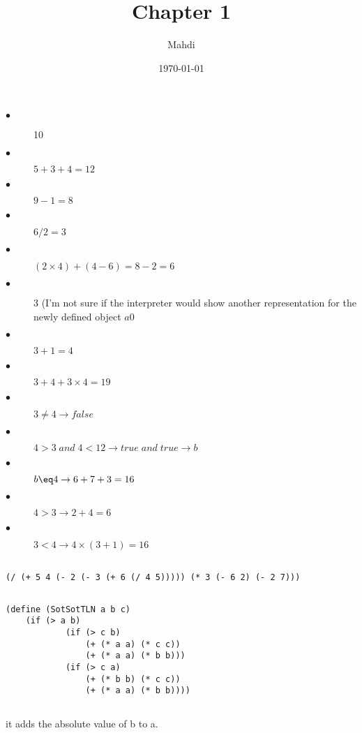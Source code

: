 \documentclass{article}
\title{Chapter 1}
\author{Mahdi}
\date\today
\begin{document}
\subsection{}
\begin{description}
  \item[$\bullet$] 10
  \item[$\bullet$] $5+3+4 = 12$
  \item[$\bullet$] $9-1 = 8$
  \item[$\bullet$] $6/2 = 3$
  \item[$\bullet$] $(2 \times 4) + (4-6) = 8-2 = 6$
  \item[$\bullet$] $3$ (I'm not sure if the interpreter would show another representation for the newly defined object $a$0
  \item[$\bullet$] $3+1 = 4$
  \item[$\bullet$] $3 + 4 + 3 \times 4 = 19$
  \item[$\bullet$] $3\neq 4 \rightarrow false$
  \item[$\bullet$] $4 > 3 \; and \; 4 < 12 \rightarrow true \; and \; true \rightarrow b $
  \item[$\bullet$] $b \eq 4 \rightarrow 6 + 7 + 3 = 16$
  \item[$\bullet$] $4 > 3 \rightarrow 2 + 4 = 6$
  \item[$\bullet$] $3 < 4 \rightarrow 4 \times (3 + 1) = 16$
\end{description}

\subsection{}
\begin{verbatim}
(/ (+ 5 4 (- 2 (- 3 (+ 6 (/ 4 5))))) (* 3 (- 6 2) (- 2 7)))
\end{verbatim}

\subsection{}
\begin{verbatim}
(define (SotSotTLN a b c) 
    (if (> a b)
            (if (> c b)
                (+ (* a a) (* c c))
                (+ (* a a) (* b b)))
            (if (> c a)
                (+ (* b b) (* c c))
                (+ (* a a) (* b b))))
\end{verbatim}

\subsection{}
it adds the absolute value of b to a.
\end{document}
